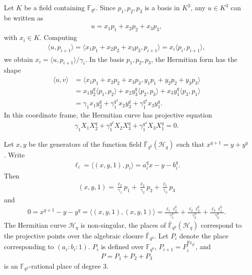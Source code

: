 \documentclass[a4paper]{amsart}
\theoremstyle{plain}
\theoremstyle{definition}
\theoremstyle{remark}
\newcommand{\Frob}{{\mathrm{Fr}_{q^2}}}
\begin{document}
Let $K$ be a field containing $\mathbb{F}_{q^6}$. Since $p_1,p_2,p_3$ is a basis in $K^3$, any $u\in K^3$ can be written as
\begin{align*} %
u=x_1p_1+x_2p_2+x_3p_3,
\end{align*}
with $x_i\in K$. Computing
\begin{align*}
\langle u, p_{i+1} \rangle = \langle x_1p_1+x_2p_2+x_3p_3, p_{i+1} \rangle = x_i \langle p_{i}, p_{i+1} \rangle,
\end{align*}
we obtain $x_i=\langle u,p_{i+1} \rangle / \gamma_i$. In the basis $p_1,p_2,p_3$, the Hermitian form has the shape
\begin{align*}
\langle u,v \rangle &= \langle x_1p_1+x_2p_2+x_3p_3,y_1p_1+y_2p_2+y_3p_3 \rangle \\
&= x_1y_2^q \langle p_1,p_2 \rangle + x_2y_3^q \langle p_2,p_3 \rangle + x_3y_1^q \langle p_3,p_1 \rangle\\
&=\gamma_1 x_1y_2^q+\gamma_1^{q^2} x_2y_3^q+\gamma_1^{q^4} x_3y_1^q.
\end{align*}
In this coordinate frame, the Hermitian curve has projective equation
\begin{align*} %
\gamma_1 X_1X_2^q+\gamma_1^{q^2} X_2X_3^q+\gamma_1^{q^4} X_3X_1^q=0.
\end{align*}

Let $x,y$ be the generators of the function field $\bar{\mathbb{F}}_{q^2}(\mathscr{H}_q)$ such that $x^{q+1}=y+y^q$. Write
\begin{align*} %
\ell_i=\langle (x,y,1), p_i \rangle = a_i^qx-y-b_i^q.
\end{align*}
Then
\begin{align*} %
(x,y,1)=\frac{\ell_{2}}{\gamma_1} p_1+\frac{\ell_{3}}{\gamma_2} p_2+\frac{\ell_{1}}{\gamma_3} p_3
\end{align*}
and
\begin{align} \label{eq:ell-q-lin-dep}
0=x^{q+1}-y-y^q = \langle (x,y,1), (x,y,1) \rangle = \frac{\ell_1\ell_{2}^q}{\gamma_1^q} + \frac{\ell_2\ell_{3}^q}{\gamma_2^q} + \frac{\ell_3\ell_{1}^q}{\gamma_3^q}.
\end{align}
The Hermitian curve $\mathscr{H}_q$ is non-singular, the places of $\bar{\mathbb{F}}_{q^2}(\mathscr{H}_q)$ correspond to the projective points over the algebraic closure $\bar{\mathbb{F}}_{q^2}$. Let $P_i$ denote the place corresponding to $(a_i:b_i:1)$. $P_i$ is defined over $\mathbb{F}_{q^6}$, $P_{i+1}=P_i^\Frob$, and 
\begin{align*} %
P=P_1+P_2+P_3
\end{align*}
is an $\mathbb{F}_{q^2}$-rational place of degree $3$. 
\end{document}
